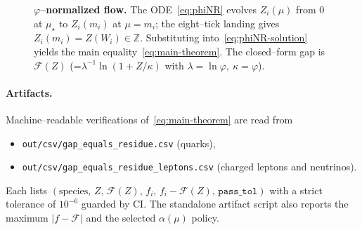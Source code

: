 \documentclass[epjc3]{svjour3}
\begin{document}
\begin{figure}[t]
  \centering
  \caption{\textbf{$\varphi$--normalized flow.} The ODE~\eqref{eq:phiNR} evolves $Z_i(\mu)$ from $0$ at $\mu_\star$ to $Z_i(m_i)$ at $\mu=m_i$; the eight--tick landing gives $Z_i(m_i)=Z(W_i)\in\mathbb{Z}$.  Substituting into~\eqref{eq:phiNR-solution} yields the main equality~\eqref{eq:main-theorem}. The closed--form gap is $\mathcal F(Z)$ (=$\lambda^{-1}\ln(1+Z/\kappa)$ with $\lambda=\ln\varphi,\ \kappa=\varphi$).}
  \label{fig:phiNR-landing}
\end{figure}

\paragraph{Artifacts.}
Machine--readable verifications of~\eqref{eq:main-theorem} are read from
\begin{itemize}
  \item \texttt{out/csv/gap\_equals\_residue.csv} (quarks),
  \item \texttt{out/csv/gap\_equals\_residue\_leptons.csv} (charged leptons and neutrinos).
\end{itemize}
Each lists $(\text{species},\,Z,\,\mathcal F(Z),\,f_i,\,f_i-\mathcal F(Z),\,\texttt{pass\_tol})$ with a strict tolerance of $10^{-6}$ guarded by CI. The standalone artifact script also reports the maximum $|f-\mathcal F|$ and the selected $\alpha(\mu)$ policy.
\end{document}
